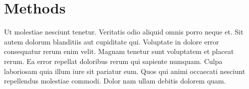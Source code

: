 \newpage
\section{Methods}

Ut molestiae nesciunt tenetur. Veritatis odio aliquid omnis porro neque et. Sit autem dolorum blanditiis aut cupiditate qui.
Voluptate in dolore error consequatur rerum enim velit. Magnam tenetur sunt voluptatem et placeat rerum. Ea error repellat doloribus rerum qui sapiente numquam. Culpa laboriosam quia illum iure sit pariatur eum. Quos qui animi occaecati nesciunt repellendus molestiae commodi. Dolor nam ullam debitis dolorem quam.